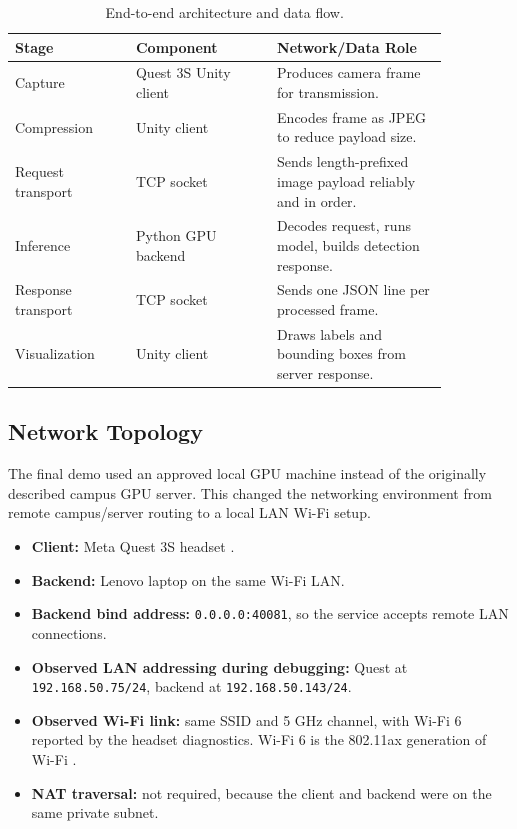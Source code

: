 \documentclass[11pt]{article}
\begin{document}
\begin{table}[h]
\centering
\begin{tabular}{>{\raggedright\arraybackslash}p{0.24\linewidth} >{\raggedright\arraybackslash}p{0.28\linewidth} >{\raggedright\arraybackslash}p{0.34\linewidth}}
\toprule
\textbf{Stage} & \textbf{Component} & \textbf{Network/Data Role} \\
\midrule
Capture & Quest 3S Unity client & Produces camera frame for transmission. \\
Compression & Unity client & Encodes frame as JPEG to reduce payload size. \\
Request transport & TCP socket & Sends length-prefixed image payload reliably and in order. \\
Inference & Python GPU backend & Decodes request, runs model, builds detection response. \\
Response transport & TCP socket & Sends one JSON line per processed frame. \\
Visualization & Unity client & Draws labels and bounding boxes from server response. \\
\bottomrule
\end{tabular}
\caption{End-to-end architecture and data flow.}
\end{table}

\subsection{Network Topology}

The final demo used an approved local GPU machine instead of the originally described campus GPU server. This changed the networking environment from remote campus/server routing to a local LAN Wi-Fi setup.

\begin{itemize}
    \item \textbf{Client:} Meta Quest 3S headset \cite{meta-quest3s}.
    \item \textbf{Backend:} Lenovo laptop on the same Wi-Fi LAN.
    \item \textbf{Backend bind address:} \texttt{0.0.0.0:40081}, so the service accepts remote LAN connections.
    \item \textbf{Observed LAN addressing during debugging:} Quest at \texttt{192.168.50.75/24}, backend at \texttt{192.168.50.143/24}.
    \item \textbf{Observed Wi-Fi link:} same SSID and 5 GHz channel, with Wi-Fi 6 reported by the headset diagnostics. Wi-Fi 6 is the 802.11ax generation of Wi-Fi \cite{wifi6}.
    \item \textbf{NAT traversal:} not required, because the client and backend were on the same private subnet.
\end{itemize}
\end{document}
